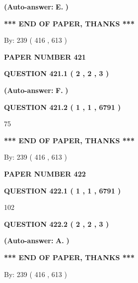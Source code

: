 \documentclass[12pt]{article}
\begin{document}
 
{\textbf{(Auto-answer:}}
{\textbf{\large{
E.}}}
{\textbf{)}}
 
 
   
   
   
   
\vspace{1.0in} 
{\textbf{\large{ *** END OF PAPER, THANKS *** }}} 
   
   
\hspace{1.0in} By: 
 239 ( 416 ,  613 )
   
   
   
   
\newpage 
\setcounter{page}{ 
   421001 } 
   
   
 {\textbf{ \Large{ PAPER NUMBER  421  }}}
   
   
   
   
  
  
{\textbf{\large{QUESTION
421.1 
 ( 2 , 2 , 3 )
}}}
 
 
{\textbf{(Auto-answer:}}
{\textbf{\large{
F.}}}
{\textbf{)}}
 
 
  
  
{\textbf{\large{QUESTION
421.2 
 ( 1 , 1 , 6791 )
}}}

75
   
   
   
   
\vspace{1.0in} 
{\textbf{\large{ *** END OF PAPER, THANKS *** }}} 
   
   
\hspace{1.0in} By: 
 239 ( 416 ,  613 )
   
   
   
   
\newpage 
\setcounter{page}{ 
   422001 } 
   
   
 {\textbf{ \Large{ PAPER NUMBER  422  }}}
   
   
   
   
  
  
{\textbf{\large{QUESTION
422.1 
 ( 1 , 1 , 6791 )
}}}

102
  
  
{\textbf{\large{QUESTION
422.2 
 ( 2 , 2 , 3 )
}}}
 
 
{\textbf{(Auto-answer:}}
{\textbf{\large{
A.}}}
{\textbf{)}}
 
 
   
   
   
   
\vspace{1.0in} 
{\textbf{\large{ *** END OF PAPER, THANKS *** }}} 
   
   
\hspace{1.0in} By: 
 239 ( 416 ,  613 )
   
   
   
\end{document}
